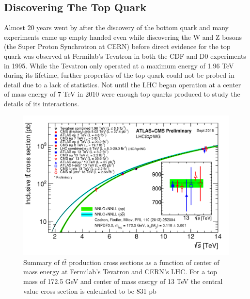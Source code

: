 \subsection{Discovering The Top Quark}

Almost 20 years went by after the discovery of the bottom quark and many experiments came up empty handed even while discovering the W and Z bosons (the Super Proton Synchrotron at CERN) before direct evidence for the top quark was observed at Fermilab's Tevatron in both the CDF and D0 experiments in 1995\cite{TopObs,TopObsD0}.  While the Tevatron only operated at a maximum energy of 1.96 TeV during its lifetime, further properties of the top quark could not be probed in detail due to a lack of statistics.  Not until the LHC began operation at a center of mass energy of 7 TeV in 2010 were enough top quarks produced to study the details of its interactions. 
\begin{figure}[h!]
	\centering
	\includegraphics[width=\columnwidth]{../ThesisImages/Theory/ttprodxsec.png}
	\caption[Summary of $t\bar{t}$ production cross sections as a function of center of mass energy at Fermilab's Tevatron and CERN's LHC]{Summary of $t\bar{t}$ production cross sections as a function of center of mass energy at Fermilab's Tevatron and CERN's LHC.  For a top mass of 172.5 GeV and center of mass energy of 13 TeV the central value cross section is calculated to be 831 pb \cite{TopWG} }
	\label{fig:ttbarXSec}
\end{figure}

